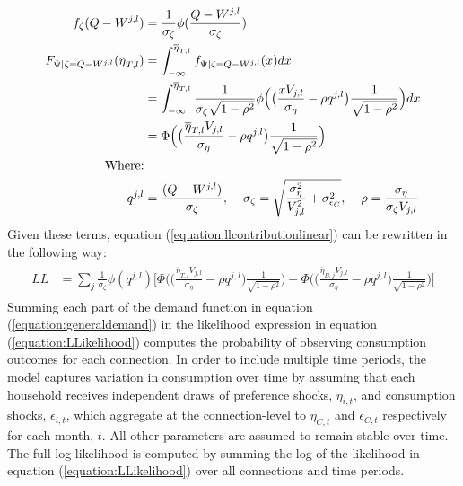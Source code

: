 \documentclass[12pt]{article}
\begin{document}
\begin{align*}
f_{\zeta}( Q - W^{j,l} ) &= \frac{1}{\sigma_{\zeta}} \phi(\frac{Q - W^{j,l}}{\sigma_{\zeta}} ) \\
F_{ \Psi | \zeta = Q - W^{j,l} } (\overline{\eta}_{T,l}) &= \int_{-\infty}^{\overline{\eta}_{T,l}} f_{\Psi | \zeta = Q - W^{j,l}} (x) dx \\
&= \int_{-\infty}^{\overline{\eta}_{T,l}} \frac{1}{\sigma_{\zeta} \sqrt{1-\rho^2}}\phi \Big ( \big ( \frac{ x V_{j,l}}{\sigma_\eta} -  \rho q^{j,l} \big )\frac{1}{\sqrt{1-\rho^2}}   \Big ) dx \\
&= \Phi \Big ( \big ( \frac{\overline{\eta}_{T,l} V_{j,l}}{\sigma_\eta} -  \rho q^{j,l} \big )\frac{1}{\sqrt{1-\rho^2}}   \Big ) \\
\text{Where:} &\\
q^{j,l} &= \frac{(Q - W^{j,l})}{\sigma_\zeta}, \hspace{.4cm}  \sigma_{\zeta} = \sqrt{ \frac{\sigma_{\eta}^2}{V_{j,l}^2} + \sigma_{\epsilon_C}^2}, \hspace{.4cm} \rho = \frac{ \sigma_{\eta}}{  \sigma_{\zeta} V_{j,l}  } 
\end{align*}
Given these terms, equation (\ref{equation:llcontributionlinear}) can be rewritten in the following way:
\begin{align}\label{equation:LLikelihood}
\begin{split}
LL &= \sum_{j}  \frac{1}{\sigma_{\zeta}} \phi (q^{j,l}) \Big[ \Phi \Big ( \big ( \frac{\overline{\eta}_{T,l} V_{j,l}}{\sigma_\eta} -  \rho q^{j,l} \big )\frac{1}{\sqrt{1-\rho^2}}   \Big ) -  \Phi \Big( \big ( \frac{\overline{\eta}_{B,j} V_{j,l}}{\sigma_\eta} -  \rho q^{j,l} \big )\frac{1}{\sqrt{1-\rho^2}}   \Big)\Big] 
\end{split}
\end{align}
Summing each part of the demand function in equation (\ref{equation:generaldemand}) in the likelihood expression in equation (\ref{equation:LLikelihood}) computes the probability of observing consumption outcomes for each connection.  In order to include multiple time periods, the model captures variation in consumption over time by assuming that each household receives independent draws of preference shocks, $\eta_{i,t}$, and consumption shocks, $\epsilon_{i,t}$, which aggregate at the connection-level to $\eta_{C,t}$ and $\epsilon_{C,t}$ respectively for each month, $t$.  All other parameters are assumed to remain stable over time.  The full log-likelihood is computed by summing the log of the likelihood in equation  (\ref{equation:LLikelihood}) over all connections and time periods.  
\end{document}
